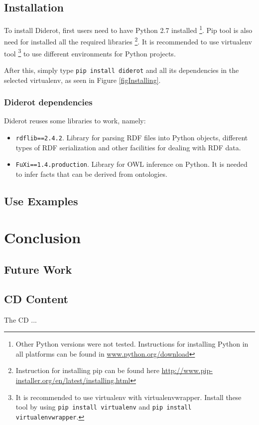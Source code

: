 \documentclass{report}
\begin{document}

\section{Installation}

To install Diderot, first users need to have Python 2.7 installed \footnote{Other Python versions were not tested. Instructions for installing Python in all platforms can be found in \url{www.python.org/download}}.
Pip tool is also need for installed all the required libraries \footnote{Instruction for installing pip can be found here \url{http://www.pip-installer.org/en/latest/installing.html}}.
It is recommended to use virtualenv tool \footnote{It is recommended to use virtualenv with virtualenvwrapper. Install these tool by using \texttt{pip install virtualenv} and \texttt{pip install virtualenvwrapper}.} to use different environments for Python projects.

After this, simply type \texttt{pip install diderot} and all its dependencies in the selected virtualenv, as seen in Figure \ref{figInstalling}.


\subsection{Diderot dependencies}

Diderot reuses some libraries to work, namely:

\begin{itemize}
    \item \texttt{rdflib==2.4.2}. Library for parsing RDF files into Python objects, different types of RDF serialization and other facilities for dealing with RDF data.
    \item \texttt{FuXi==1.4.production}. Library for OWL inference on Python.
        It is needed to infer facts that can be derived from ontologies.
\end{itemize}
\section{Use Examples}

\chapter{Conclusion}
\label{conclusion}

\section{Future Work}

\begin{appendices}
\chapter{CD Content}

The CD ...

\end{appendices}



\end{document}
